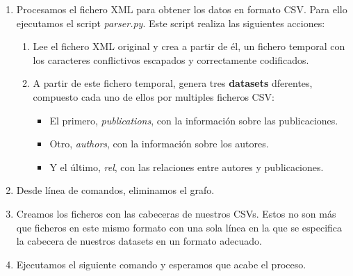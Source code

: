 \begin{enumerate}
 \item Procesamos el fichero \gls{XML} para obtener los datos en formato \gls{CSV}. Para ello ejecutamos el script \textit{parser.py}. Este script realiza las siguientes acciones:
 \begin{enumerate}
  \item Lee el fichero \gls{XML} original y crea a partir de él, un fichero temporal con los caracteres conflictivos escapados y correctamente codificados.
  \item A partir de este fichero temporal, genera tres \textbf{datasets} dferentes, compuesto cada uno de ellos por multiples ficheros \gls{CSV}:
  \begin{itemize}
   \item El primero, \textit{publications}, con la información sobre las publicaciones.
   \item Otro, \textit{authors}, con la información sobre los autores.
   \item Y el último, \textit{rel}, con las relaciones entre autores y publicaciones.
  \end{itemize}
 \end{enumerate}
 \item Desde línea de comandos, eliminamos el grafo.
 \item Creamos los ficheros con las cabeceras de nuestros \glspl{CSV}. Estos no son más que ficheros en este mismo formato con una sola línea en la que se especifica la cabecera de nuestros datasets en un formato adecuado.
 \item Ejecutamos el siguiente comando y esperamos que acabe el proceso.
\end{enumerate}




